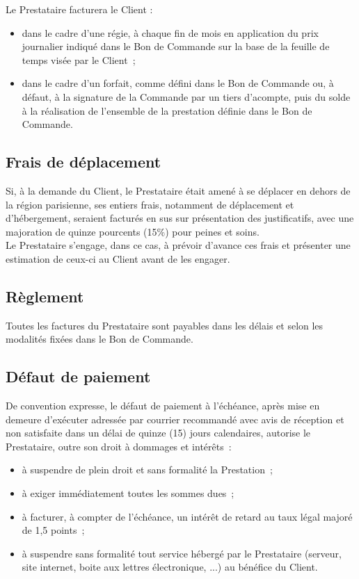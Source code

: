 \documentclass[8pt,french]{base}
\begin{document}
\begin{multicols*}{3}
Le Prestataire facturera le Client :
\begin{itemize}
  \item dans le cadre d’une régie, à chaque fin de mois en application du prix journalier indiqué dans le Bon de Commande sur la base de la feuille de temps visée par le Client~;
  \item dans le cadre d’un forfait, comme défini dans le Bon de Commande ou, à défaut, à la signature de la Commande par un tiers d’acompte, puis du solde à la réalisation de l’ensemble de la prestation définie dans le Bon de Commande.
\end{itemize}

\subsection{Frais de déplacement}

Si, à la demande du Client, le Prestataire était amené à se déplacer en dehors de la région parisienne, ses entiers frais, notamment de déplacement et d’hébergement, seraient facturés en sus sur présentation des justificatifs, avec une majoration de quinze pourcents (15\%) pour peines et soins. \\
Le Prestataire s’engage, dans ce cas, à prévoir d’avance ces frais et présenter une estimation de ceux-ci au Client avant de les engager.

\subsection{Règlement}

Toutes les factures du Prestataire sont payables dans les délais et selon les modalités fixées dans le Bon de Commande.

\subsection{Défaut de paiement}

De convention expresse, le défaut de paiement à l’échéance, après mise en demeure d’exécuter adressée par courrier recommandé avec avis de réception et non satisfaite dans un délai de quinze (15) jours calendaires, autorise le Prestataire, outre son droit à dommages et intérêts~:
\begin{itemize}
  \item à suspendre de plein droit et sans formalité la Prestation~;
  \item à exiger immédiatement toutes les sommes dues~;
  \item à facturer, à compter de l’échéance, un intérêt de retard au taux légal majoré de 1,5 points~;
  \item à suspendre sans formalité tout service hébergé par le Prestataire (serveur, site internet, boite aux lettres électronique, ...) au bénéfice du Client.
\end{itemize}


\end{multicols*}
\end{document}

